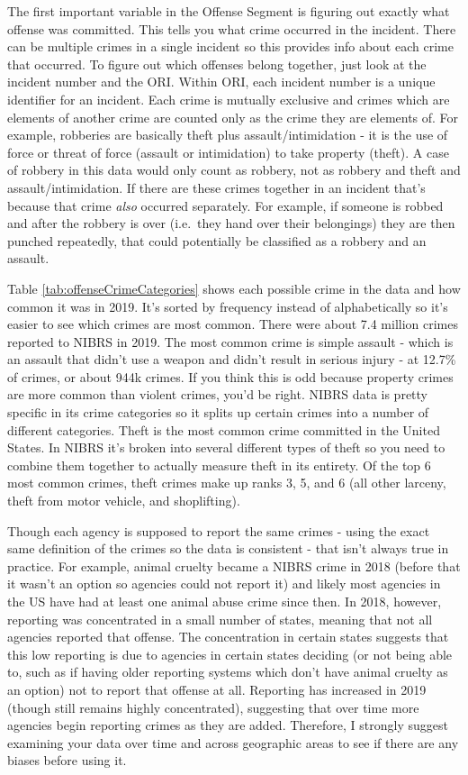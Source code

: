 \documentclass[
  12pt,
  openany]{book}
\begin{document}
The first important variable in the Offense Segment is figuring out exactly what offense was committed. This tells you what crime occurred in the incident. There can be multiple crimes in a single incident so this provides info about each crime that occurred. To figure out which offenses belong together, just look at the incident number and the ORI. Within ORI, each incident number is a unique identifier for an incident. Each crime is mutually exclusive and crimes which are elements of another crime are counted only as the crime they are elements of. For example, robberies are basically theft plus assault/intimidation - it is the use of force or threat of force (assault or intimidation) to take property (theft). A case of robbery in this data would only count as robbery, not as robbery and theft and assault/intimidation. If there are these crimes together in an incident that's because that crime \emph{also} occurred separately. For example, if someone is robbed and after the robbery is over (i.e.~they hand over their belongings) they are then punched repeatedly, that could potentially be classified as a robbery and an assault.

Table \ref{tab:offenseCrimeCategories} shows each possible crime in the data and how common it was in 2019. It's sorted by frequency instead of alphabetically so it's easier to see which crimes are most common. There were about 7.4 million crimes reported to NIBRS in 2019. The most common crime is simple assault - which is an assault that didn't use a weapon and didn't result in serious injury - at 12.7\% of crimes, or about 944k crimes. If you think this is odd because property crimes are more common than violent crimes, you'd be right. NIBRS data is pretty specific in its crime categories so it splits up certain crimes into a number of different categories. Theft is the most common crime committed in the United States. In NIBRS it's broken into several different types of theft so you need to combine them together to actually measure theft in its entirety. Of the top 6 most common crimes, theft crimes make up ranks 3, 5, and 6 (all other larceny, theft from motor vehicle, and shoplifting).

Though each agency is supposed to report the same crimes - using the exact same definition of the crimes so the data is consistent - that isn't always true in practice. For example, animal cruelty became a NIBRS crime in 2018 (before that it wasn't an option so agencies could not report it) and likely most agencies in the US have had at least one animal abuse crime since then. In 2018, however, reporting was concentrated in a small number of states, meaning that not all agencies reported that offense. The concentration in certain states suggests that this low reporting is due to agencies in certain states deciding (or not being able to, such as if having older reporting systems which don't have animal cruelty as an option) not to report that offense at all. Reporting has increased in 2019 (though still remains highly concentrated), suggesting that over time more agencies begin reporting crimes as they are added. Therefore, I strongly suggest examining your data over time and across geographic areas to see if there are any biases before using it.
\end{document}
